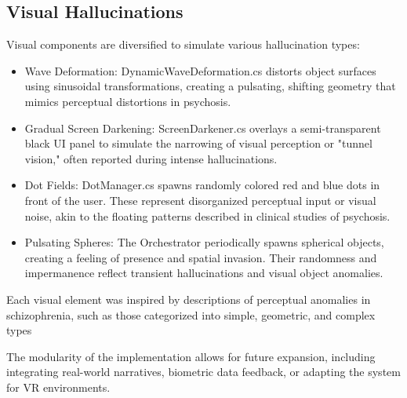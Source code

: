 \subsection{Visual Hallucinations}
Visual components are diversified to simulate various hallucination types:
\begin{itemize}
    \item Wave Deformation: DynamicWaveDeformation.cs distorts object surfaces using sinusoidal transformations, creating a pulsating, shifting geometry that mimics perceptual distortions in psychosis.
    \item Gradual Screen Darkening: ScreenDarkener.cs overlays a semi-transparent black UI panel to simulate the narrowing of visual perception or "tunnel vision," often reported during intense hallucinations.
    \item Dot Fields: DotManager.cs spawns randomly colored red and blue dots in front of the user. These represent disorganized perceptual input or visual noise, akin to the floating patterns described in clinical studies of psychosis.
    \item Pulsating Spheres: The Orchestrator periodically spawns spherical objects, creating a feeling of presence and spatial invasion. Their randomness and impermanence reflect transient hallucinations and visual object anomalies.
\end{itemize}

Each visual element was inspired by descriptions of perceptual anomalies in schizophrenia, such as those categorized into simple, geometric, and complex types \cite{Silverstein2021,Vanommen2019}

The modularity of the implementation allows for future expansion, including integrating real-world narratives, biometric data feedback, or adapting the system for VR environments.